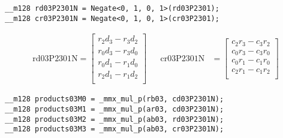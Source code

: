 \begin{verbatim}
__m128 rd03P2301N = Negate<0, 1, 0, 1>(rd03P2301);
__m128 cr03P2301N = Negate<0, 1, 0, 1>(cr03P2301);
\end{verbatim}

\begin{align*}
\mathrm{rd03P2301N} 
=
\begin{bmatrix}
r_2d_3 - r_3d_2\\
r_0d_3 - r_3d_0\\
r_0d_1 - r_1d_0\\
r_2d_1 - r_1d_2\\
\end{bmatrix}
&&
\mathrm{cr03P2301N} 
&=
\begin{bmatrix}
c_2r_3 - c_3r_2\\
c_0r_3 - c_3r_0\\
c_0r_1 - c_1r_0\\
c_2r_1 - c_1r_2\\
\end{bmatrix}
\end{align*}

\begin{verbatim}
__m128 products03M0 = _mmx_mul_p(rb03, cd03P2301N);
__m128 products03M1 = _mmx_mul_p(ar03, cd03P2301N);
__m128 products03M2 = _mmx_mul_p(ab03, rd03P2301N);
__m128 products03M3 = _mmx_mul_p(ab03, cr03P2301N);
\end{verbatim}

